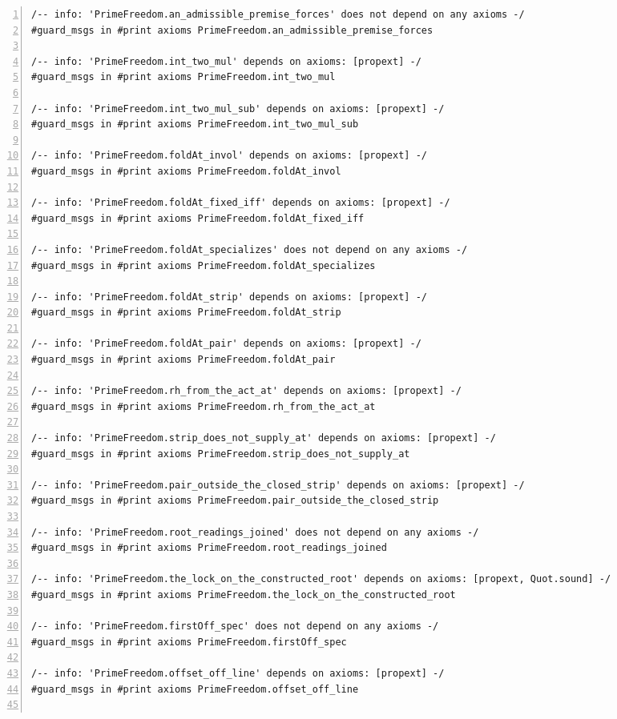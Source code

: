 \documentclass[10pt]{article}
\newcommand{\leansize}{\fontsize{5.5pt}{6.75pt}\selectfont}
\begin{document}
\begin{multicols}{2}
\begin{Verbatim}[numbers=left,firstnumber=1,numbersep=3pt,xleftmargin=2.6em,breaklines=true,breakanywhere=true,breakautoindent=false,breakindent=1.4em,breaksymbolleft={},breakanywheresymbolpre={},fontsize=\leansize]
/-- info: 'PrimeFreedom.an_admissible_premise_forces' does not depend on any axioms -/
#guard_msgs in #print axioms PrimeFreedom.an_admissible_premise_forces

/-- info: 'PrimeFreedom.int_two_mul' depends on axioms: [propext] -/
#guard_msgs in #print axioms PrimeFreedom.int_two_mul

/-- info: 'PrimeFreedom.int_two_mul_sub' depends on axioms: [propext] -/
#guard_msgs in #print axioms PrimeFreedom.int_two_mul_sub

/-- info: 'PrimeFreedom.foldAt_invol' depends on axioms: [propext] -/
#guard_msgs in #print axioms PrimeFreedom.foldAt_invol

/-- info: 'PrimeFreedom.foldAt_fixed_iff' depends on axioms: [propext] -/
#guard_msgs in #print axioms PrimeFreedom.foldAt_fixed_iff

/-- info: 'PrimeFreedom.foldAt_specializes' does not depend on any axioms -/
#guard_msgs in #print axioms PrimeFreedom.foldAt_specializes

/-- info: 'PrimeFreedom.foldAt_strip' depends on axioms: [propext] -/
#guard_msgs in #print axioms PrimeFreedom.foldAt_strip

/-- info: 'PrimeFreedom.foldAt_pair' depends on axioms: [propext] -/
#guard_msgs in #print axioms PrimeFreedom.foldAt_pair

/-- info: 'PrimeFreedom.rh_from_the_act_at' depends on axioms: [propext] -/
#guard_msgs in #print axioms PrimeFreedom.rh_from_the_act_at

/-- info: 'PrimeFreedom.strip_does_not_supply_at' depends on axioms: [propext] -/
#guard_msgs in #print axioms PrimeFreedom.strip_does_not_supply_at

/-- info: 'PrimeFreedom.pair_outside_the_closed_strip' depends on axioms: [propext] -/
#guard_msgs in #print axioms PrimeFreedom.pair_outside_the_closed_strip

/-- info: 'PrimeFreedom.root_readings_joined' does not depend on any axioms -/
#guard_msgs in #print axioms PrimeFreedom.root_readings_joined

/-- info: 'PrimeFreedom.the_lock_on_the_constructed_root' depends on axioms: [propext, Quot.sound] -/
#guard_msgs in #print axioms PrimeFreedom.the_lock_on_the_constructed_root

/-- info: 'PrimeFreedom.firstOff_spec' does not depend on any axioms -/
#guard_msgs in #print axioms PrimeFreedom.firstOff_spec

/-- info: 'PrimeFreedom.offset_off_line' depends on axioms: [propext] -/
#guard_msgs in #print axioms PrimeFreedom.offset_off_line


\end{Verbatim}
\end{multicols}
\end{document}

